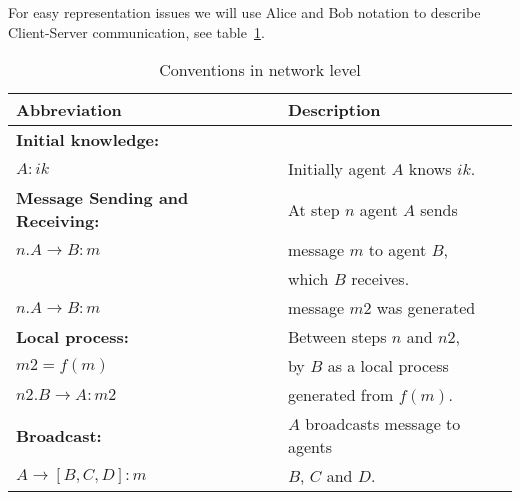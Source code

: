 For easy representation issues we will use Alice and Bob notation to 
describe Client-Server communication, see table~\ref{table:NetConventions}.
\begin{table}[htb]
\footnotesize
\begin{center}
\caption{Conventions in network level}
\label{table:NetConventions}
\begin{tabular}{|l|l|}
\hline
{\bf Abbreviation}                      & {\bf Description}                    \\\hline\hline
\textbf{Initial knowledge:}             &                                      \\
$A : ik$                                &  Initially agent $A$ knows $ik$.    \\ \hline 
\textbf{Message Sending and Receiving:} &  At step $n$ agent $A$ sends         \\ 
$n. A \rightarrow B: m$                 &  message $m$ to agent $B$,\\
                                        &  which $B$ receives.      \\ \hline 
$n. A\rightarrow B: m$                  &  message $m2$ was generated \\ 
\hspace{5mm}\textbf{Local process:}     &  Between steps $n$ and $n2$,    \\ 
\hspace{5mm}$m2 = f(m)$                 &  by $B$ as a local process \\ 
$n2. B\rightarrow A: m2$                &  generated from $f(m)$.     \\ \hline 
\textbf{Broadcast:}                     &  $A$ broadcasts message to agents\\ 
$A \rightarrow [B, C, D]: m$            &  $B$, $C$ and $D$.\\ \hline \hline 
\end{tabular}
\end{center}
\end{table}
\normalsize


$$$$
